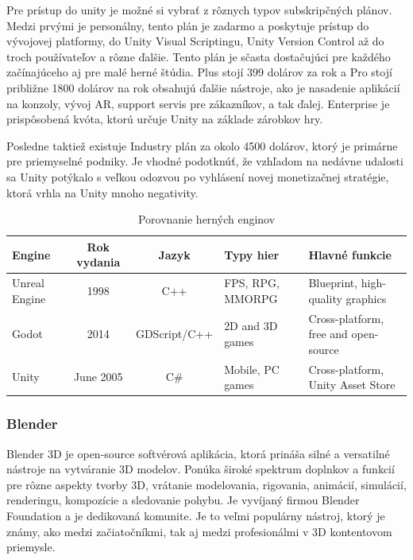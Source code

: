 Pre prístup do unity je možné si vybrať z rôznych typov subskripčných plánov. Medzi prvými je personálny, tento plán je zadarmo a poskytuje prístup do vývojovej platformy, do Unity Visual Scriptingu, Unity Version Control až do troch používateľov a rôzne ďalšie. Tento plán je sčasta dostačujúci pre každého začínajúceho aj pre malé herné štúdia. Plus stojí 399 dolárov za rok a Pro stojí približne 1800 dolárov na rok obsahujú ďalšie nástroje, ako je nasadenie aplikácií na konzoly, vývoj AR, support servis pre zákazníkov, a tak ďalej. Enterprise je prispôsobená kvóta, ktorú určuje Unity na základe zárobkov hry. 

Posledne taktiež existuje Industry plán za okolo 4500 dolárov, ktorý je primárne pre priemyselné podniky. Je vhodné podotknúť, že vzhľadom na nedávne udalosti sa Unity potýkalo s veľkou odozvou po vyhlásení novej monetizačnej stratégie, ktorá vrhla na Unity mnoho negativity.  \cite{lacoma2023unity}

\begin{table}[!h]
\centering
\caption{Porovnanie herných enginov}
\label{tab:game-engines}
\begin{tabularx}{\textwidth}{|l|c|c|X|X|}
\hline
\textbf{Engine} & \textbf{Rok vydania} & \textbf{Jazyk} & \textbf{Typy hier} & \textbf{Hlavné funkcie} \\ \hline
Unreal Engine & 1998 & C++ & FPS, RPG, MMORPG & Blueprint, high-quality graphics \\ \hline
Godot & 2014 & GDScript/C++ & 2D and 3D games & Cross-platform, free and open-source \\ \hline
Unity & June 2005 & C\# & Mobile, PC games & Cross-platform, Unity Asset Store \\ \hline
\end{tabularx}
\end{table}

\FloatBarrier 

\subsubsection{Blender}

Blender 3D je open-source softvérová aplikácia, ktorá prináša silné a versatilné nástroje na vytváranie 3D modelov. Ponúka široké spektrum doplnkov a funkcií pre rôzne aspekty tvorby 3D, vrátanie modelovania, rigovania, animácií, simulácií, renderingu, kompozície a sledovanie pohybu. Je vyvíjaný firmou Blender Foundation a je dedikovaná komunite. Je to veľmi populárny nástroj, ktorý je známy, ako medzi začiatočníkmi, tak aj medzi profesionálmi v 3D kontentovom priemysle. 

